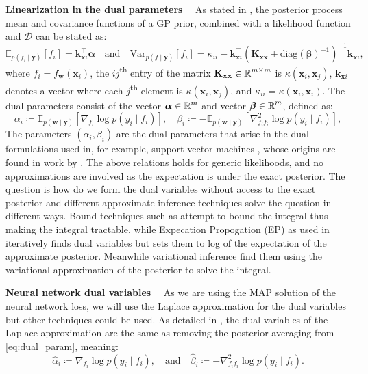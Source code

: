 \documentclass{article}
\renewcommand{\paragraph}[1]{{\bf #1}~~}
\newcommand{\dataset}{\ensuremath{\mathcal{D}}}
\newcommand{\weights}{\ensuremath{\mathbf{w}}}
\newcommand{\mathbold}[1]{\bm{#1}}
\newcommand{\mbf}[1]{\mathbf{#1}}
\newcommand{\valpha}[0]{\mathbold{\alpha}}
\newcommand{\vbeta}[0]{\mathbold{\beta}}
\newcommand{\diag}{\text{{diag}}}
\newcommand{\vx}{\mbf{x}}
\newcommand{\vy}{\mbf{y}}
\newcommand{\vw}{\mbf{w}}
\newcommand{\MKxx}{\mbf{K}_{\mbf{x}\mbf{x}}}
\newcommand{\vk}{\mbf{k}}
\newcommand{\myexpect}{\mathbb{E}}
\begin{document}
\paragraph{Linearization in the dual parameters}
As stated in \citet[Lemma~1]{csato2002sparse}, the posterior process mean and covariance functions of a GP prior, combined with a likelihood function and $\dataset$ can be stated as:
\begin{equation}  \label{eq:gp_pred}
 \myexpect_{p(f_i \mid\vy)}[f_i] = \vk_{\vx i}^\top \valpha \quad \text{and} \quad
\mathrm{Var}_{p(f\mid\vy)}[f_i] = \kappa_{ii} - \vk_{\vx i}^\top ( \MKxx + \diag(\vbeta)^{-1})^{-1} \vk_{\vx i},
\end{equation}
where $f_i = f_\weights(\vx_i)$, the $ij$\textsuperscript{th} entry of the matrix $\MKxx \in \R^{m \times m}$ is $\kappa(\vx_i,\vx_j)$, $\vk_{\vx i}$ denotes a vector where each $j$\textsuperscript{th} element is $\kappa(\vx_i, \vx_j)$, and $\kappa_{ii} = \kappa(\vx_i, \vx_i)$.  The dual parameters consist of the vector $\valpha \in \R^{m}$ and vector $\vbeta \in \R^{m}$, defined as:
\begin{equation}
\label{eq:dual_param}
\alpha_i \coloneqq \myexpect_{p(\vw \mid \vy)}[\nabla_{f_i}\log p(y_i \mid f_i)],  \quad
\beta_i \coloneqq - \myexpect_{p(\vw \mid \vy)}[\nabla^2_{f_i f_i}\log p(y_i \mid f_i)] ,
\end{equation}
%
The parameters $(\alpha_i, \beta_i)$ are the dual parameters that arise in the dual formulations used in, for example, support vector machines \citep{cortes1995support}, whose origins are found in work by \citet{kimeldorf1971some}. The above relations holds for generic likelihoods, and no approximations are involved as the expectation is under the exact posterior. The question is how do we form the dual variables without access to the exact posterior and different approximate inference techniques solve the question in different ways. Bound techniques such as \citet{jaakkola1997variational} attempt to bound the integral thus making the integral tractable, while Expecation Propogation (EP) as used in \citet{csato2002sparse} iteratively finds dual variables but sets them to log of the expectation of the approximate posterior. Meanwhile variational inference  \cite{khan2017conjugate, adam2021dual} find them using the variational approximation of the posterior to solve the integral.

\paragraph{Neural network dual variables}
As we are using the MAP solution of the neural network loss, we will use the Laplace approximation for the dual variables but other techniques could be used. As detailed in \cite{wilkinson2023bayes, rasmussen2006gaussian}, the dual variables of the Laplace approximation are the same as removing the posterior averaging from \cref{eq:dual_param}, meaning:
\begin{equation}
\label{eq:dual_param_laplace}
\hat{\alpha}_i \coloneqq \nabla_{f_i}\log p(y_i \mid f_i),  \quad \text{and} \quad
\hat{\beta}_i \coloneqq - \nabla^2_{f_i f_i}\log p(y_i \mid f_i).
\end{equation}
\end{document}
